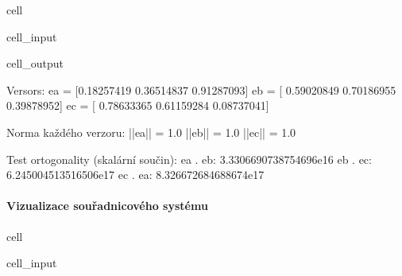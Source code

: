 \documentclass[letterpaper,10pt,english]{jupyterBook}
\begin{document}
\begin{sphinxuseclass}{cell}
\begin{sphinxVerbatimInput}
\begin{sphinxuseclass}{cell_input}
\end{sphinxuseclass}\end{sphinxVerbatimInput}
\begin{sphinxVerbatimOutput}

\begin{sphinxuseclass}{cell_output}
\begin{sphinxVerbatim}[commandchars=\\\{\}]
 Versors: 
ea = [0.18257419 0.36514837 0.91287093] 
eb = [ 0.59020849  0.70186955 \PYGZhy{}0.39878952] 
ec = [ 0.78633365 \PYGZhy{}0.61159284  0.08737041]

 Norma každého verzoru: 
 ||ea|| = 1.0 
 ||eb|| = 1.0 
 ||ec|| = 1.0

 Test ortogonality (skalární součin): 
 ea . eb: \PYGZhy{}3.3306690738754696e\PYGZhy{}16 
 eb . ec: 6.245004513516506e\PYGZhy{}17 
 ec . ea: 8.326672684688674e\PYGZhy{}17
\end{sphinxVerbatim}

\end{sphinxuseclass}\end{sphinxVerbatimOutput}

\end{sphinxuseclass}

\paragraph{Vizualizace souřadnicového systému}
\label{\detokenize{Prednasky/0_3_Sou_u0159adnicov_xe9_syst_xe9my:id1}}
\begin{sphinxuseclass}{cell}\begin{sphinxVerbatimInput}

\begin{sphinxuseclass}{cell_input}
\begin{sphinxVerbatim}[commandchars=\\\{\}]
\end{sphinxVerbatim}

\end{sphinxuseclass}\end{sphinxVerbatimInput}

\end{sphinxuseclass}
\end{document}
